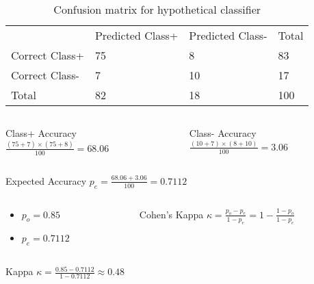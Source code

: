\begin{frame}
	\begin{table}[htb]
		\centering
		\begin{tabular}{llll}
			\multicolumn{1}{c}{} & Predicted Class+ & Predicted Class- & Total \\ \cmidrule{2-4}
			Correct Class+	& \num{75}	& \num{8}	& 83\\
			Correct Class-	& \num{7}	& \num{10}	& 17\\ \cmidrule{1-4}
			Total			& 82		& 18		& 100
		\end{tabular}
		\caption{Confusion matrix for hypothetical classifier}
	\end{table}	
	\begin{columns}
		\begin{column}{0.5\textwidth}
			\begin{block}{Class+ Accuracy}
				\centering
				$\frac{(75+7)\times(75+8)}{100} = 68.06$
			\end{block}
		\end{column}
		\begin{column}{0.5\textwidth}  %
			\begin{block}{Class- Accuracy}
				\centering
				$\frac{(10+7)\times(8+10)}{100} = 3.06$
			\end{block}
		\end{column}
	\end{columns}
	\begin{block}{Expected Accuracy}
		\centering
		$p_e = \frac{68.06+3.06}{100} = 0.7112$
	\end{block}
\note{
	
}
\end{frame}

\begin{frame}
	
	\begin{columns}
		\begin{column}{0.5\textwidth}
			\begin{itemize}
				\item $p_o = 0.85$
				\item $p_e = 0.7112$
			\end{itemize}
		\end{column}
		\begin{column}{0.5\textwidth}  %
			\begin{block}{Cohen's Kappa}
				\centering
				$\kappa = \frac{p_o-p_e}{1-p_e} = 1-\frac{1-p_o}{1-p_e}$
			\end{block}
		\end{column}
	\end{columns}
	
	\begin{block}{Kappa}
		\centering
		$\kappa = \frac{0.85-0.7112}{1-0.7112} \approx 0.48$
	\end{block}
\end{frame}

